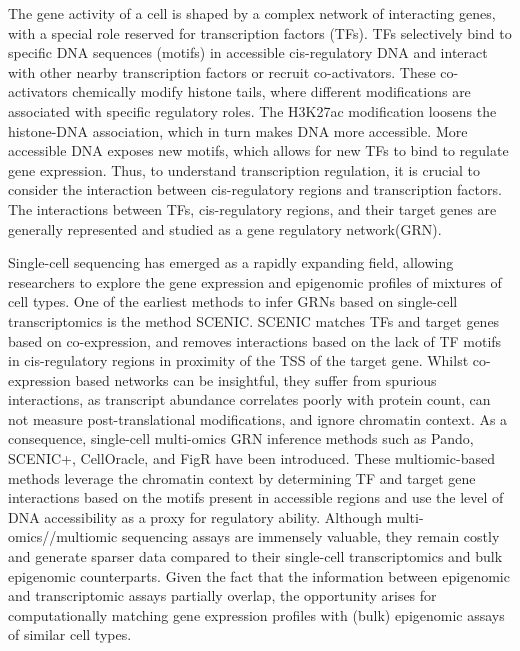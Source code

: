 The gene activity of a cell is shaped by a complex network of interacting genes, with a special role reserved for transcription factors (TFs). TFs selectively bind to specific DNA sequences (motifs) in accessible cis-regulatory DNA and interact with other nearby transcription factors or recruit co-activators\cite{Spitz2012}. These co-activators chemically modify histone tails, where different modifications are associated with specific regulatory roles. The H3K27ac modification loosens the histone-DNA association, which in turn makes DNA more accessible\cite{Creyghton2010}. More accessible DNA exposes new motifs, which allows for new TFs to bind to regulate gene expression\cite{Tsompana2014}. Thus, to understand transcription regulation, it is crucial to consider the interaction between cis-regulatory regions and transcription factors\cite{Xu_2020,Kamal_2021,Gonz_lez_Blas_2022,Fleck2022,Kamimoto2023,Kartha2022}. The interactions between TFs, cis-regulatory regions, and their target genes are generally represented and studied as a gene regulatory network(GRN).

Single-cell sequencing has emerged as a rapidly expanding field, allowing researchers to explore the gene expression and epigenomic profiles of mixtures of cell types. One of the earliest methods to infer GRNs based on single-cell transcriptomics is the method SCENIC\cite{Aibar_2017}. SCENIC matches TFs and target genes based on co-expression, and removes interactions based on the lack of TF motifs in cis-regulatory regions in proximity of the TSS of the target gene. Whilst co-expression based networks can be insightful, they suffer from spurious interactions, as transcript abundance correlates poorly with protein count\cite{Fortelny2017,Franks2017}, can not measure post-translational modifications, and ignore chromatin context. As a consequence, single-cell multi-omics GRN inference methods such as Pando\cite{Fleck2022}, SCENIC+\cite{Gonz_lez_Blas_2022}, CellOracle\cite{Kamimoto2023}, and FigR\cite{Kartha2022} have been introduced. These multiomic-based methods leverage the chromatin context by determining TF and target gene interactions based on the motifs present in accessible regions and use the level of DNA accessibility as a proxy for regulatory ability. Although multi-omics//multiomic sequencing assays are immensely valuable, they remain costly and generate sparser data compared to their single-cell transcriptomics and bulk epigenomic counterparts\cite{Li2021}. Given the fact that the information between epigenomic and transcriptomic assays partially overlap\cite{Wang2016,GonzlezRamrez2021}, the opportunity arises for computationally matching gene expression profiles with (bulk) epigenomic assays of similar cell types. 

